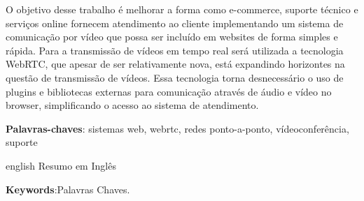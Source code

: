 
\setlength{\absparsep}{18pt} %
\begin{resumo}
O objetivo desse trabalho é melhorar a forma como e-commerce, suporte técnico e serviços online fornecem atendimento ao cliente implementando um sistema de comunicação por vídeo que possa ser incluído em websites de forma simples e rápida. Para a transmissão de vídeos em tempo real será utilizada a tecnologia WebRTC, que apesar de ser relativamente nova, está expandindo horizontes na questão de transmissão de vídeos. Essa tecnologia torna desnecessário o uso de plugins e bibliotecas externas para comunicação através de áudio e vídeo no browser, simplificando o acesso ao sistema de atendimento.

\textbf{Palavras-chaves}:  sistemas web, webrtc, redes ponto-a-ponto, vídeoconferência, suporte
\end{resumo}

\begin{resumo}[Abstract]
 \begin{otherlanguage*}{english}
Resumo em Inglês
   \vspace{\onelineskip}
 
   \noindent 
   \textbf{Keywords}:Palavras Chaves.
 \end{otherlanguage*}
\end{resumo}

% 
%
%  
